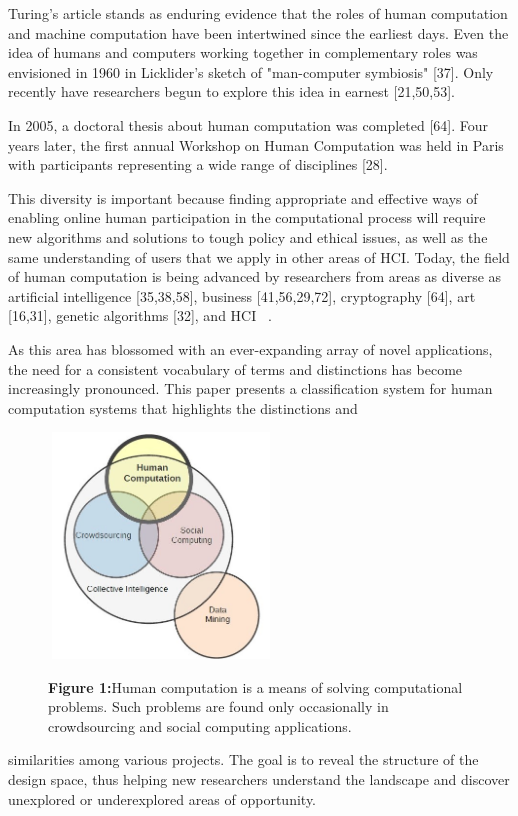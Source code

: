 \documentclass{acm_proc_article-sp}
\begin{document}
Turing's article stands as enduring evidence that the roles of human computation and machine computation have been intertwined since the earliest days. Even the idea of humans and computers working together in complementary roles was envisioned in 1960 in Licklider's sketch of "man-computer symbiosis" [37]. Only recently have researchers begun to explore this 
idea in earnest [21,50,53].

In 2005, a doctoral thesis about human computation was completed [64].
 Four years later, the first annual Workshop on Human Computation was held in Paris with participants representing a wide range of disciplines [28].

 This diversity is important because finding appropriate and effective ways of enabling online human participation in the computational process will require new algorithms and solutions to tough policy and ethical issues, as well as the same understanding of users that we apply in other areas of HCI. 
Today, the field of human computation is being advanced by researchers from areas as diverse as artificial intelligence [35,38,58], business [41,56,29,72],
 cryptography [64], art [16,31], genetic algorithms [32], and HCI  ~\cite{hu2010,bernstein2015,bigham2010}.

As this area has blossomed with an ever-expanding array of novel applications, the need for a consistent vocabulary of terms and distinctions has become increasingly pronounced.
This paper presents a classification system for human computation systems that highlights the distinctions and

\begin{figure}[h]
\includegraphics[width=6cm,height=6cm]{graf}

\textbf{Figure 1:}Human computation is a means of solving computational problems. Such problems are found only occasionally in crowdsourcing and social computing applications.
\end{figure}
similarities among various projects. The goal is to reveal the structure of the design space, thus helping new researchers understand the landscape and discover unexplored or underexplored areas of opportunity.
\end{document}
